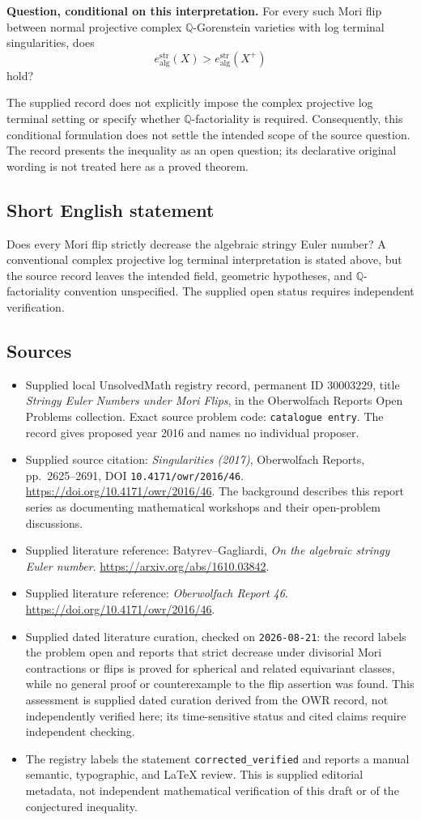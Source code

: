 \documentclass[11pt]{article}
\newcommand{\Q}{\mathbb{Q}}
\begin{document}
\textbf{Question, conditional on this interpretation.} For every such Mori flip between normal projective complex \(\Q\)-Gorenstein varieties with log terminal singularities, does
\[
 e_{\mathrm{alg}}^{\mathrm{str}}(X)
 >e_{\mathrm{alg}}^{\mathrm{str}}(X^+)
\]
hold?

The supplied record does not explicitly impose the complex projective log terminal setting or specify whether \(\Q\)-factoriality is required. Consequently, this conditional formulation does not settle the intended scope of the source question. The record presents the inequality as an open question; its declarative original wording is not treated here as a proved theorem.
\subsection{Short English statement}
Does every Mori flip strictly decrease the algebraic stringy Euler number? A conventional complex projective log terminal interpretation is stated above, but the source record leaves the intended field, geometric hypotheses, and \(\Q\)-factoriality convention unspecified. The supplied open status requires independent verification.
\subsection{Sources}
\begin{itemize}
\item Supplied local UnsolvedMath registry record, permanent ID \(30003229\), title \emph{Stringy Euler Numbers under Mori Flips}, in the Oberwolfach Reports Open Problems collection. Exact source problem code: \texttt{catalogue entry}. The record gives proposed year 2016 and names no individual proposer.
\item Supplied source citation: \emph{Singularities (2017)}, Oberwolfach Reports, pp.\ 2625--2691, DOI \texttt{10.4171/owr/2016/46}. \url{https://doi.org/10.4171/owr/2016/46}. The background describes this report series as documenting mathematical workshops and their open-problem discussions.
\item Supplied literature reference: Batyrev--Gagliardi, \emph{On the algebraic stringy Euler number}. \url{https://arxiv.org/abs/1610.03842}.
\item Supplied literature reference: \emph{Oberwolfach Report 46}. \url{https://doi.org/10.4171/owr/2016/46}.
\item Supplied dated literature curation, checked on \texttt{2026-08-21}: the record labels the problem open and reports that strict decrease under divisorial Mori contractions or flips is proved for spherical and related equivariant classes, while no general proof or counterexample to the flip assertion was found. This assessment is supplied dated curation derived from the OWR record, not independently verified here; its time-sensitive status and cited claims require independent checking.
\item The registry labels the statement \texttt{corrected\_verified} and reports a manual semantic, typographic, and LaTeX review. This is supplied editorial metadata, not independent mathematical verification of this draft or of the conjectured inequality.
\end{itemize}
\end{document}
